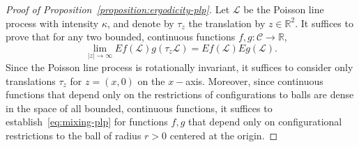 \documentclass[10pt]{amsart}
\theoremstyle{definition}\newtheorem{defi}[theo]{Definition}\newtheorem{rema}[theo]{Remark}\newtheorem{exam}[theo]{Example}\newtheorem{exem}[theo]{Example}\newtheorem{nota}[theo]{Notation}
\newcommand{\zz}[1]{\mathbb #1}
\begin{document}
\begin{proof}[Proof of Proposition~\ref{proposition:ergodicity-plp}]
Let $\mathcal{L}$ be the Poisson line process with intensity $\kappa$, and denote by $\tau_{z}$ the translation by $z\in \zz{R}^{2}$. It suffices to prove that for any two bounded, continuous functions $f,g:\mathcal{C}\rightarrow \zz{R}$,
\begin{equation}\label{eq:mixing-plp}
\lim_{|z| \rightarrow \infty}Ef (\mathcal{L})g (\tau_{z}\mathcal{L})=Ef (\mathcal{L})Eg (\mathcal{L}).
\end{equation}
Since the Poisson line process is rotationally invariant, it suffices to consider only translations $\tau_{z}$ for $z= (x,0)$ on the $x-$axis. Moreover, since continuous functions that depend only on the restrictions of configurations to balls are dense in the space of all bounded, continuous functions, it suffices to establish~\eqref{eq:mixing-plp} for functions $f,g$ that depend only on configurational restrictions to the ball of radius $r>0$ centered at the origin.


\end{proof}
\end{document}

